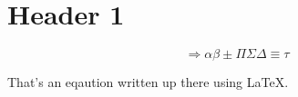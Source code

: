 \documentclass[10pts]{article}
\begin{document}
\section{Header 1}

\begin{equation}
\Rightarrow\alpha\beta\pm\Pi\Sigma\Delta\equiv\tau
\end{equation}

That's an eqaution written up there using \LaTeX .
\end{document}
